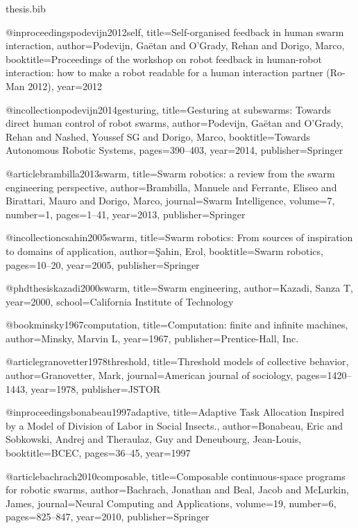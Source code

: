 \documentclass[a4paper, 12pt]{report}
\begin{document}
\begin{filecontents}{thesis.bib}

@inproceedings{podevijn2012self,
  title={Self-organised feedback in human swarm interaction},
  author={Podevijn, Ga{\"e}tan and O’Grady, Rehan and Dorigo, Marco},
  booktitle={Proceedings of the workshop on robot feedback in human-robot interaction: how to make a robot readable for a human interaction partner (Ro-Man 2012)},
  year={2012}
}

@incollection{podevijn2014gesturing,
  title={Gesturing at subswarms: Towards direct human control of robot swarms},
  author={Podevijn, Ga{\"e}tan and O’Grady, Rehan and Nashed, Youssef SG and Dorigo, Marco},
  booktitle={Towards Autonomous Robotic Systems},
  pages={390--403},
  year={2014},
  publisher={Springer}
}

@article{brambilla2013swarm,
  title={Swarm robotics: a review from the swarm engineering perspective},
  author={Brambilla, Manuele and Ferrante, Eliseo and Birattari, Mauro and Dorigo, Marco},
  journal={Swarm Intelligence},
  volume={7},
  number={1},
  pages={1--41},
  year={2013},
  publisher={Springer}
}

@incollection{csahin2005swarm,
  title={Swarm robotics: From sources of inspiration to domains of application},
  author={{\c{S}}ahin, Erol},
  booktitle={Swarm robotics},
  pages={10--20},
  year={2005},
  publisher={Springer}
}

@phdthesis{kazadi2000swarm,
  title={Swarm engineering},
  author={Kazadi, Sanza T},
  year={2000},
  school={California Institute of Technology}
}

@book{minsky1967computation,
  title={Computation: finite and infinite machines},
  author={Minsky, Marvin L},
  year={1967},
  publisher={Prentice-Hall, Inc.}
}

@article{granovetter1978threshold,
  title={Threshold models of collective behavior},
  author={Granovetter, Mark},
  journal={American journal of sociology},
  pages={1420--1443},
  year={1978},
  publisher={JSTOR}
}

@inproceedings{bonabeau1997adaptive,
  title={Adaptive Task Allocation Inspired by a Model of Division of Labor in Social Insects.},
  author={Bonabeau, Eric and Sobkowski, Andrej and Theraulaz, Guy and Deneubourg, Jean-Louis},
  booktitle={BCEC},
  pages={36--45},
  year={1997}
}

@article{bachrach2010composable,
  title={Composable continuous-space programs for robotic swarms},
  author={Bachrach, Jonathan and Beal, Jacob and McLurkin, James},
  journal={Neural Computing and Applications},
  volume={19},
  number={6},
  pages={825--847},
  year={2010},
  publisher={Springer}
}


\end{filecontents}
\end{document}
